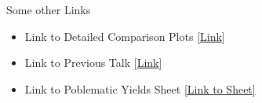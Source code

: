 

    

\begin{subframe}{Some other Links}
    \begin{itemize}
        \item Link to Detailed Comparison Plots [\href{https://github.com/Pawan-Johnson/DQFollowUp_PPT/blob/main/build/main.pdf}{Link}]
        \item Link to Previous Talk [\href{https://indico.cern.ch/event/1488927/}{Link}]
        \item Link to Poblematic Yields Sheet  \href{https://docs.google.com/spreadsheets/d/1nnYFcmhVieSHI5XAVhPiW1K6CoGYGxv2YPchwL0sqH4/edit?usp=sharing}{[Link to Sheet]}
    \end{itemize}
    
\end{subframe}
